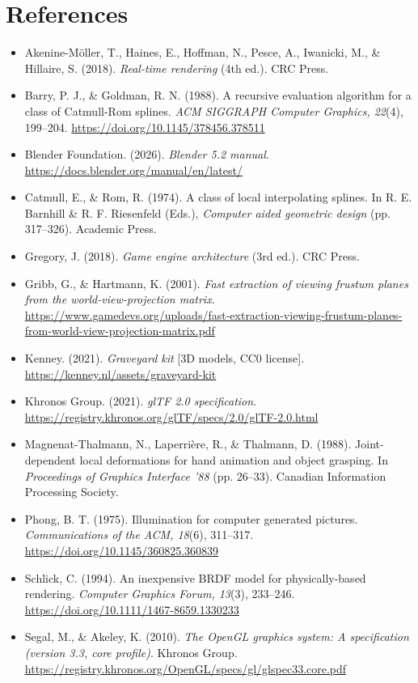 \documentclass[letter,12pt]{article}
\begin{document}
	\section{References}
	\begin{itemize}[leftmargin=*]
		\item Akenine-Möller, T., Haines, E., Hoffman, N., Pesce, A., Iwanicki, M., \& Hillaire, S. (2018). \textit{Real-time rendering} (4th ed.). CRC Press.
		\item Barry, P. J., \& Goldman, R. N. (1988). A recursive evaluation algorithm for a class of Catmull-Rom splines. \textit{ACM SIGGRAPH Computer Graphics, 22}(4), 199--204. \url{https://doi.org/10.1145/378456.378511}
		\item Blender Foundation. (2026). \textit{Blender 5.2 manual}. \url{https://docs.blender.org/manual/en/latest/}
		\item Catmull, E., \& Rom, R. (1974). A class of local interpolating splines. In R. E. Barnhill \& R. F. Riesenfeld (Eds.), \textit{Computer aided geometric design} (pp. 317--326). Academic Press.
		\item Gregory, J. (2018). \textit{Game engine architecture} (3rd ed.). CRC Press.
		\item Gribb, G., \& Hartmann, K. (2001). \textit{Fast extraction of viewing frustum planes from the world-view-projection matrix}. \url{https://www.gamedevs.org/uploads/fast-extraction-viewing-frustum-planes-from-world-view-projection-matrix.pdf}
		\item Kenney. (2021). \textit{Graveyard kit} [3D models, CC0 license]. \url{https://kenney.nl/assets/graveyard-kit}
		\item Khronos Group. (2021). \textit{glTF 2.0 specification}. \url{https://registry.khronos.org/glTF/specs/2.0/glTF-2.0.html}
		\item Magnenat-Thalmann, N., Laperrière, R., \& Thalmann, D. (1988). Joint-dependent local deformations for hand animation and object grasping. In \textit{Proceedings of Graphics Interface '88} (pp. 26--33). Canadian Information Processing Society.
		\item Phong, B. T. (1975). Illumination for computer generated pictures. \textit{Communications of the ACM, 18}(6), 311--317. \url{https://doi.org/10.1145/360825.360839}
		\item Schlick, C. (1994). An inexpensive BRDF model for physically-based rendering. \textit{Computer Graphics Forum, 13}(3), 233--246. \url{https://doi.org/10.1111/1467-8659.1330233}
		\item Segal, M., \& Akeley, K. (2010). \textit{The OpenGL graphics system: A specification (version 3.3, core profile)}. Khronos Group. \url{https://registry.khronos.org/OpenGL/specs/gl/glspec33.core.pdf}

\end{itemize}
\end{document}
